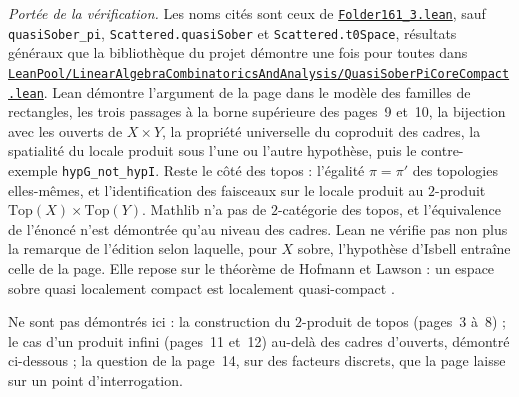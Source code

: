 \begingroup\raggedright
\noindent\emph{Portée de la vérification.} Les noms cités sont ceux de \href{\leanblobmain/CategoryTheory/Folder161_3.lean}{\texttt{Folder161\_3.\allowbreak{}lean}}, sauf \texttt{quasiSober\_pi}, \texttt{Scattered.\allowbreak{}quasiSober} et \texttt{Scattered.\allowbreak{}t0Space}, résultats généraux que la bibliothèque du projet démontre une fois pour toutes dans \href{https://github.com/Commutator-IO/GrothendieckArchivesProofs/blob/main/LeanPool/LinearAlgebraCombinatoricsAndAnalysis/QuasiSoberPiCoreCompact.lean}{\texttt{LeanPool/\allowbreak LinearAlgebraCombinatoricsAndAnalysis/\allowbreak QuasiSoberPiCoreCompact.lean}}. Lean démontre l'argument de la page dans le modèle des familles de rectangles, les trois passages à la borne supérieure des pages~9 et~10, la bijection avec les ouverts de $X \times Y$, la propriété universelle du coproduit des cadres, la spatialité du locale produit sous l'une ou l'autre hypothèse, puis le contre-exemple \texttt{hypG\_not\_hypI}. Reste le côté des topos : l'égalité $\pi = \pi'$ des topologies elles-mêmes, et l'identification des faisceaux sur le locale produit au $2$-produit $\mathrm{Top}(X) \times \mathrm{Top}(Y)$. Mathlib n'a pas de $2$-catégorie des topos, et l'équivalence de l'énoncé n'est démontrée qu'au niveau des cadres. Lean ne vérifie pas non plus la remarque de l'édition selon laquelle, pour $X$ sobre, l'hypothèse d'Isbell entraîne celle de la page. Elle repose sur le théorème de Hofmann et Lawson : un espace sobre quasi localement compact est localement quasi-compact \cite[cor.~4.6]{hofmannlawson1978}.\par\endgroup

Ne sont pas démontrés ici : la construction du $2$-produit de topos (pages~3 à~8) ; le cas d'un produit infini (pages~11 et~12) au-delà des cadres d'ouverts, démontré ci-dessous ; la question de la page~14, sur des facteurs discrets, que la page laisse sur un point d'interrogation.

